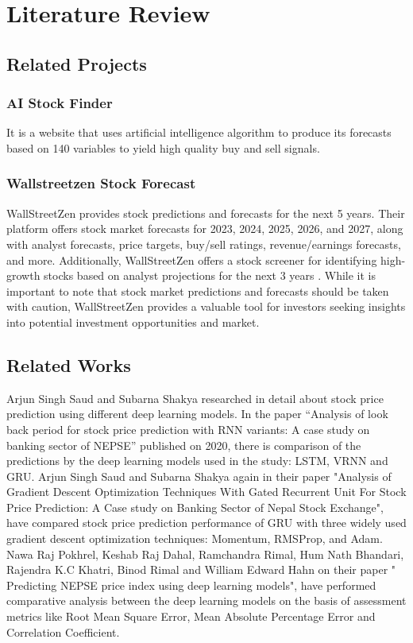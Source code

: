 \chapter{Literature Review}
\vspace{-18pt}
\section{Related Projects}
\vspace{-18pt}
\subsection{AI Stock Finder}
\vspace{-18pt}
It is a website that uses artificial intelligence algorithm to produce its forecasts based on 140 variables to yield high quality buy and sell signals. 
 \vspace{-10pt}
\subsection{Wallstreetzen Stock Forecast}
\vspace{-18pt}
WallStreetZen provides stock predictions and forecasts for the next 5 years. Their platform offers stock market forecasts for 2023, 2024, 2025, 2026, and 2027, along with analyst forecasts, price targets, buy/sell ratings, revenue/earnings forecasts, and more. Additionally, WallStreetZen offers a stock screener for identifying high-growth stocks based on analyst projections for the next 3 years . While it is important to note that stock market predictions and forecasts should be taken with caution, WallStreetZen provides a valuable tool for investors seeking insights into potential investment opportunities and market.
\vspace{-10pt}
\section{Related Works}
\vspace{-18pt}
Arjun Singh Saud and Subarna Shakya researched in detail about stock price prediction using different deep learning models. In the paper “Analysis of look back period for stock price prediction with RNN variants: A case study on banking sector of NEPSE” published on 2020, there is comparison of the predictions by the deep learning models used in the study: LSTM, VRNN and GRU. \cite{saud2020analysis}  Arjun Singh Saud and Subarna Shakya again in their paper "Analysis of Gradient Descent Optimization Techniques With Gated Recurrent Unit For Stock Price Prediction: A Case study on Banking Sector of Nepal Stock Exchange", have compared stock price prediction performance of GRU with three widely used gradient descent optimization techniques: Momentum, RMSProp, and Adam.\cite{saud2019analysis}  Nawa Raj Pokhrel, Keshab Raj Dahal, Ramchandra Rimal, Hum Nath Bhandari, Rajendra K.C Khatri, Binod Rimal and William Edward Hahn on their paper " Predicting NEPSE price index using deep learning models", have performed comparative analysis between the deep learning models on the basis of assessment metrics like Root Mean Square Error, Mean Absolute Percentage Error and Correlation Coefficient. \cite{pokhrel2022predicting}
